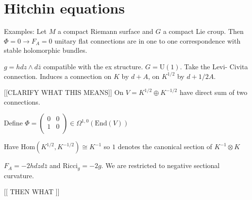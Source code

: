\section{Hitchin equations} %



Examples: 
Let $ M $ a compact Riemann surface and $ G$ a compact Lie croup. 
Then $ \Phi = 0 \rightarrow F_A = 0 $ unitary flat connections are in one to one correspondence with stable holomorphic bundles. 

$ g = h dz \wedge d \bar{z} $ compatible with the ex structure. 
$ G = \mathrm{U} ( 1) $. 
Take the Levi- Civita connection. 
Induces a connection on $K$ by $ d + A $, 
on $ K^{1/2} $ by $ d + 1/2 A $. 

[[CLARIFY WHAT THIS MEANS]]
On $ V = K^{1/2} \oplus K^{-1/2} $ have direct sum of two connections. 

Define $ \Phi = \left( \begin{array}{rr}
    0 & 0 \\
    1 & 0 \\
\end{array} \right) 
\in \Omega ^{1,0} ( \mathrm{End} (V) ) $ 

Have $ \mathrm{Hom} ( K^{1/2} , K^{-1/2} ) \cong K ^{-1} $ so $1$ denotes the canonical section of $ K^{-1} \otimes K $ 

$F_A = - 2h dz d \bar{z} $ and $ \mathrm{Ricci}_g = -2 g $.
We are restricted to negative sectional curvature. 

[[ THEN WHAT ]] 













 

